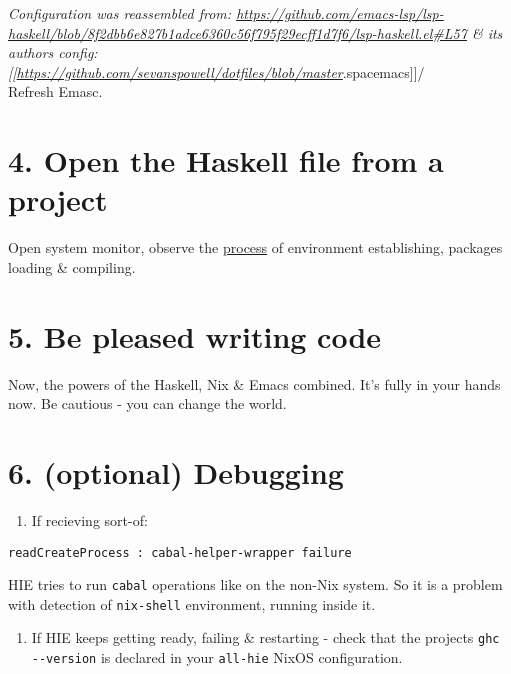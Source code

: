 \documentclass[a4paper,14pt,oneside]{book}
\begin{document}
\emph{Configuration was reassembled from: \url{https://github.com/emacs-lsp/lsp-haskell/blob/8f2dbb6e827b1adce6360c56f795f29ecff1d7f6/lsp-haskell.el\#L57} \& its authors config: [[\url{https://github.com/sevanspowell/dotfiles/blob/master}}.spacemacs]]/\\

Refresh Emasc.\\

\section{4. Open the Haskell file from a project}
\label{sec:orgdea6a71}

Open system monitor, observe the \hyperref[org77d7365]{process} of environment establishing, packages loading \& compiling.\\

\section{5. Be pleased writing code}
\label{sec:org51da5ea}

Now, the powers of the Haskell, Nix \& Emacs combined. It's fully in your hands now. Be cautious - you can change the world.\\

\section{6. (optional) Debugging}
\label{sec:org59b4931}

\begin{enumerate}
\item If recieving sort-of:\\
\end{enumerate}

\begin{verbatim}
readCreateProcess : cabal-helper-wrapper failure
\end{verbatim}

HIE tries to run \texttt{cabal} operations like on the non-Nix system. So it is a problem with detection of \texttt{nix-shell} environment, running inside it.\\

\begin{enumerate}
\item If HIE keeps getting ready, failing \& restarting - check that the projects \texttt{ghc -{}-version} is declared in your \texttt{all-hie} NixOS configuration.\\
\end{enumerate}
\end{document}

